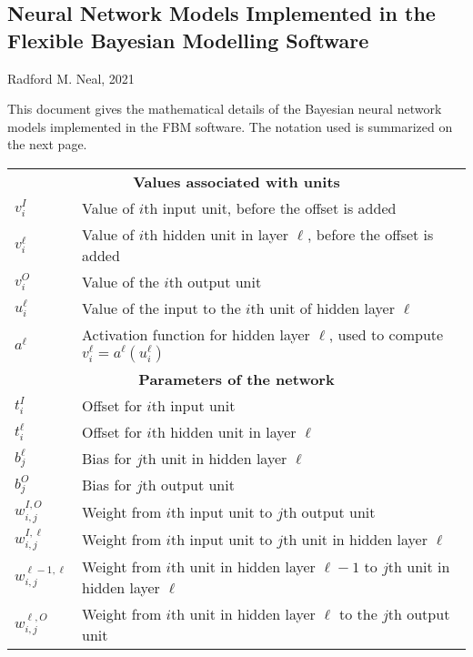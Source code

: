 \documentclass{report}[11pt]
\begin{document}
\subsection*{Neural Network Models Implemented in the Flexible
   Bayesian Modelling Software}

Radford M. Neal, 2021

This document gives the mathematical details of the Bayesian neural
network models implemented in the FBM software.  The notation used is
summarized on the next page.

\begin{table}[p]
\begin{center}\small
\begin{tabular}{ll}
%
  \multicolumn{2}{c}{\bf Values associated with units} \\[5pt]
%
  $v^I_i$            & Value of $i$th input unit, before the offset is 
                       added \\[3pt]
  $v^{\ell}_i$       & Value of $i$th hidden unit in layer $\ell$, before the  
                       offset is added \\[3pt]
  $v^O_i$            & Value of the $i$th output unit \\[10pt]

  $u^{\ell}_i$       & Value of the input to the $i$th unit of hidden
                       layer $\ell$ \\[3pt]
  $a^{\ell}$         & Activation function for hidden layer $\ell$, used
                       to compute $v^{\ell}_i = a^{\ell}(u^{\ell}_i)$\\[11pt]
%
  \multicolumn{2}{c}{\bf Parameters of the network} \\[5pt]
%
  $t^I_i$            & Offset for $i$th input unit \\[3pt]
  $t^\ell_i$         & Offset for $i$th hidden unit in layer $\ell$ \\[3pt]

  $b^{\ell}_j$       & Bias for $j$th unit in hidden layer $\ell$ \\[3pt]
  $b^O_j$            & Bias for $j$th output unit \\[10pt]

  $w^{I,O}_{i,j}$    & Weight from $i$th input unit to $j$th output unit \\[3pt]
  $w^{I,\ell}_{i,j}$ & Weight from $i$th input unit to $j$th unit in hidden
                       layer $\ell$ \\[3pt]
  $w^{\ell\!-\!1,\ell}_{i,j}$ & Weight from $i$th unit in hidden layer
                       $\ell\!-\!1$ to $j$th unit in hidden layer $\ell$ \\[3pt]
  $w^{\ell,O}_{i,j}$   & Weight from $i$th unit in hidden layer $\ell$ to the
                       $j$th output unit \\[10pt]


\end{tabular}
\end{center}
\end{table}
\end{document}
